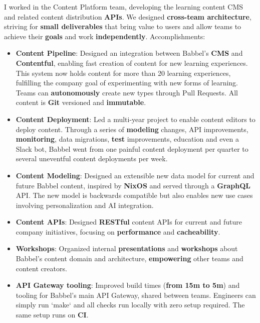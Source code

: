 \documentclass[10pt,a4paper,ragged2e,withhyper]{altacv}
\begin{document}
\begin{paracol}{2}



{\RaggedRight
I worked in the Content Platform team, developing the learning content CMS and related content distribution \textbf{APIs}. We designed \textbf{cross-team architecture}, striving for \textbf{small deliverables} that bring value to users and allow teams to achieve their \textbf{goals} and work \textbf{independently}. Accomplishments:

\begin{itemize}
\item \textbf{Content Pipeline}: Designed an integration between Babbel's \textbf{CMS} and \textbf{Contentful}, enabling fast creation of content for new learning experiences. This system now holds content for more than 20 learning experiences, fulfilling the company goal of experimenting with new forms of learning. Teams can \textbf{autonomously} create new types through Pull Requests. All content is \textbf{Git} versioned and \textbf{immutable}.
\item \textbf{Content Deployment}: Led a multi-year project to enable content editors to deploy content. Through a series of \textbf{modeling} changes, API improvements, \textbf{monitoring}, data migrations, \textbf{test} improvements, education and even a Slack bot, Babbel went from one painful content deployment per quarter to several uneventful content deployments per week.
\item \textbf{Content Modeling}: Designed an extensible new data model for current and future Babbel content, inspired by \textbf{NixOS} and served through a \textbf{GraphQL} API. The new model is backwards compatible but also enables new use cases involving personalization and AI integration.
\item \textbf{Content APIs}: Designed \textbf{RESTful} content APIs for current and future company initiatives, focusing on \textbf{performance} and \textbf{cacheability}.
\item \textbf{Workshops}: Organized internal \textbf{presentations} and \textbf{workshops} about Babbel's content domain and architecture, \textbf{empowering} other teams and content creators.
\item \textbf{API Gateway tooling}: Improved build times (\textbf{from 15m to 5m}) and tooling for Babbel's main API Gateway, shared between teams. Engineers can simply run `make` and all checks run locally with zero setup required. The same setup runs on \textbf{CI}.

\end{itemize}}
\end{paracol}
\end{document}
